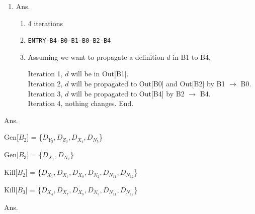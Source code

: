 \documentclass[11pt]{homework}
\begin{document}
\begin{enumerate}[label=(\alph*)]
\item Ans.

\begin{multicols}{2}
    \centering
    
    \columnbreak
    \begin{enumerate}[label=\roman*.]
        \item 4 iterations
        \item \texttt{ENTRY-B4-B0-B1-B0-B2-B4}
        \item Assuming we want to propagate a definition $d$ in B1 to B4,
        \begin{flushleft}
            Iteration 1, $d$ will be in Out[B1].\\
            Iteration 2, $d$ will be propagated to Out[B0] and Out[B2] by B1 $\to$ B0.\\
            Iteration 3, $d$ will be propagated to Out[B4] by B2 $\to$ B4.\\
            Iteration 4, nothing changes. End.
        \end{flushleft}
    \end{enumerate}
\end{multicols}

\end{enumerate}

\question
Ans.

Gen[$B_2$] = \{$D_{Y_3}, D_{Z_3}, D_{X_4}, D_{N_5}$\}

Gen[$B_3$] = \{$D_{X_1}, D_{N_2}$\}

Kill[$B_2$] = \{$D_{X_1}, D_{X_7}, D_{X_8}, D_{N_2}, D_{N_{11}}, D_{N_{12}} $\}

Kill[$B_3$] = \{$D_{X_4}, D_{X_7}, D_{X_8}, D_{N_5}, D_{N_{11}}, D_{N_{12}} $\}

\question
Ans.
\end{document}
